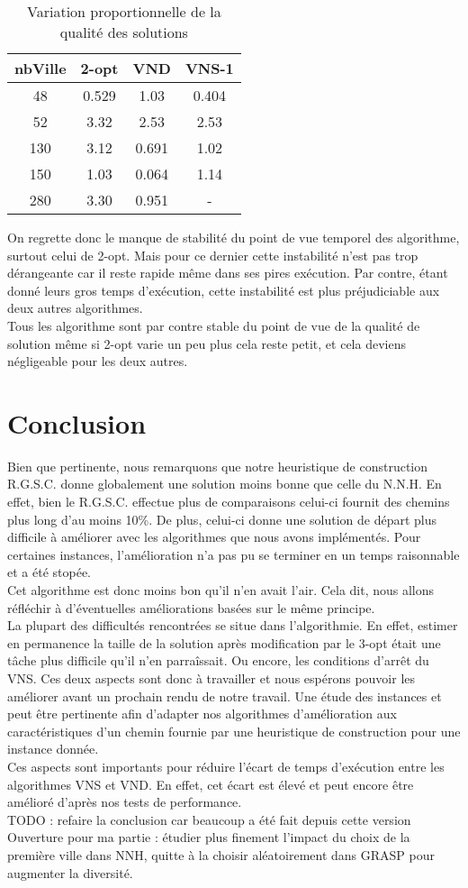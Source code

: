 \documentclass[12pt,a4paper]{article}
\begin{document}
\begin{table}[!h]
\centering
\begin{tabular}{|*{4}{c|}}
  \hline
  nbVille & 2-opt & VND & VNS-1 \\
  \hline
  48 & 0.529 & 1.03 & 0.404 \\
  52 & 3.32 & 2.53 & 2.53 \\
  130 & 3.12 & 0.691 & 1.02 \\
  150 & 1.03 & 0.064 & 1.14 \\
  280 & 3.30 & 0.951 & - \\
  \hline
\end{tabular}
\caption{Variation proportionnelle de la qualité des solutions}
\label{vartempsGRASP}
\end{table}

On regrette donc le manque de stabilité du point de vue temporel des algorithme, surtout celui de 2-opt. Mais pour ce dernier cette instabilité n'est pas trop dérangeante car il reste rapide même dans ses pires exécution. Par contre, étant donné leurs gros temps d’exécution, cette instabilité est plus préjudiciable aux deux autres algorithmes.\\

Tous les algorithme sont par contre stable du point de vue de la qualité de solution même si 2-opt varie un peu plus cela reste petit, et cela deviens négligeable pour les deux autres.

\section{Conclusion}
Bien que pertinente, nous remarquons que notre heuristique de construction R.G.S.C. donne globalement une solution moins bonne que celle du N.N.H. En effet, bien le R.G.S.C. effectue plus de comparaisons celui-ci fournit des chemins plus long d'au moins 10\%. De plus, celui-ci donne une solution de départ plus difficile à améliorer avec les algorithmes que nous avons implémentés. Pour certaines instances, l'amélioration n'a pas pu se terminer en un temps raisonnable et a été stopée.\\
Cet algorithme est donc moins bon qu'il n'en avait l'air. Cela dit, nous allons réfléchir à d'éventuelles améliorations basées sur le même principe.\\
La plupart des difficultés rencontrées se situe dans l'algorithmie. En effet, estimer en permanence la taille de la solution après modification par le 3-opt était une tâche plus difficile qu'il n'en parraîssait. Ou encore, les conditions d'arrêt du VNS. Ces deux aspects sont donc à travailler et nous espérons pouvoir les améliorer avant un prochain rendu de notre travail. Une étude des instances et peut être pertinente afin d'adapter nos algorithmes d'amélioration aux caractéristiques d'un chemin fournie par une heuristique de construction pour une instance donnée.\\
Ces aspects sont importants pour réduire l'écart de temps d’exécution entre les algorithmes VNS et VND. En effet, cet écart est élevé et peut encore être amélioré d'après nos tests de performance.\\

TODO : refaire la conclusion car beaucoup a été fait depuis cette version\\

Ouverture pour ma partie : étudier plus finement l'impact du choix de la première ville dans NNH, quitte à la choisir aléatoirement dans GRASP pour augmenter la diversité.
\end{document}
